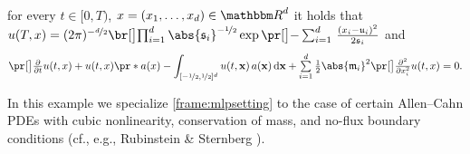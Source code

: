 \begin{example}
			for every
				$t\in [0,T)$,
				$x = (x_1,\dots,x_d) \in \R^d$
			it holds that
				$u(T,x)= (2\pi)^{-\nicefrac{d}{2}}\bbr{ \prod_{ i = 1 }^d \abs{\mathfrak{s}_i}^{-\nicefrac{1}{2}}} \exp \bpr{-\sum_{i = 1}^d \, \frac{(x_i - \mathfrak{u}_i )^2}{2\mathfrak{s}_i}}$ and
			\begin{equation}
				\label{eqMLP:aniso_mutator_selector}
				\bpr{\tfrac{\partial }{\partial t}u} (t,x) 
				+
				u(t,x)\pr*{a(x) - \int_{[-\nicefrac12,\nicefrac12]^d} u(t,\mathbf{x})\, a(\mathbf{x}) \, \diff\mathbf{x} } 
				+ \smallsuml_{i=1}^{d} \tfrac{1}{2} \abs{\mathfrak{m}_i}^2 \bpr{\tfrac{\partial^2 }{\partial x_i^2} u} (t,x) 
				=
				0
				.
		\end{equation}
\end{example}


\begin{example}
	\label{exampleMLP:allen_cahn}
	In this example we specialize \cref{frame:mlpsetting} to the case of certain Allen--Cahn PDEs with cubic nonlinearity, conservation of mass, and no-flux boundary conditions (cf., e.g., Rubinstein \& Sternberg \cite{RUBINSTEIN1992}).
	

\end{example}
